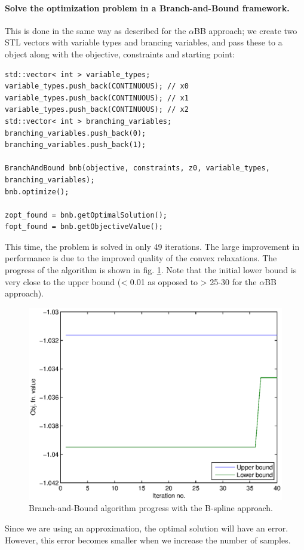 \paragraph{Solve the optimization problem in a Branch-and-Bound framework.} This is done in the same way as described for the $\alpha$BB approach; we create two STL vectors with variable types and brancing variables, and pass these to a  object along with the objective, constraints and starting point:
\begin{lstlisting}
std::vector< int > variable_types;
variable_types.push_back(CONTINUOUS); // x0
variable_types.push_back(CONTINUOUS); // x1
variable_types.push_back(CONTINUOUS); // x2
std::vector< int > branching_variables;
branching_variables.push_back(0);
branching_variables.push_back(1);

BranchAndBound bnb(objective, constraints, z0, variable_types, branching_variables);
bnb.optimize();    

zopt_found = bnb.getOptimalSolution();
fopt_found = bnb.getObjectiveValue();
\end{lstlisting}
This time, the problem is solved in only 49 iterations. The large improvement in performance is due to the improved quality of the convex relaxations. The progress of the algorithm is shown in fig. \ref{fig:shcb_progress3}. Note that the initial lower bound is very close to the upper bound (< 0.01 as opposed to > 25-30 for the $\alpha$BB approach).
\begin{figure}[H]
\centering
\includegraphics[width=\textwidth]{figures/shcb_progress3.eps}
\caption{Branch-and-Bound algorithm progress with the B-spline approach.}
\label{fig:shcb_progress3}
\end{figure}
Since we are using an approximation, the optimal solution will have an error. However, this error becomes smaller when we increase the number of samples.
